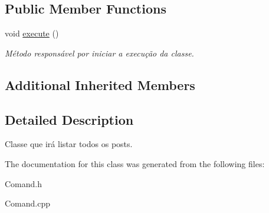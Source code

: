 \subsection*{Public Member Functions}
\begin{DoxyCompactItemize}
\item 
\hypertarget{class_command_find_all_post_a701c5ce055da556f02e95e33ef2a7334}{void \hyperlink{class_command_find_all_post_a701c5ce055da556f02e95e33ef2a7334}{execute} ()}\label{class_command_find_all_post_a701c5ce055da556f02e95e33ef2a7334}

\begin{DoxyCompactList}\small\item\em Método responsável por iniciar a execução da classe. \end{DoxyCompactList}\end{DoxyCompactItemize}
\subsection*{Additional Inherited Members}


\subsection{Detailed Description}
Classe que irá listar todos os posts. 

The documentation for this class was generated from the following files\-:\begin{DoxyCompactItemize}
\item 
Comand.\-h\item 
Comand.\-cpp\end{DoxyCompactItemize}
